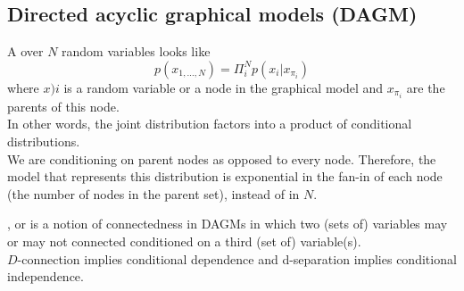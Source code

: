 \documentclass[11pt]{article}
\begin{document}
\subsection{Directed acyclic graphical models (DAGM)}
A  over $N$ random variables looks like
$$p(x_{1, \hdots, N}) = \Pi_i^N p(x_i|x_{\pi_i})$$
where $x)i$ is a random variable or a node in the graphical model and $x_{\pi_i}$ are the parents of this node. \\
In other words, the joint distribution factors into a product of conditional distributions. \\
\remark
We are conditioning on parent nodes as opposed to every node. Therefore, the model that represents this distribution is exponential in the fan-in of each node (the number of nodes in the parent set), instead of in $N$.

, or  is a notion of connectedness in DAGMs in which two (sets of) variables may or may not connected conditioned on a third (set of) variable(s). \\
$D$-connection implies conditional dependence and d-separation implies conditional independence.
\end{document}
